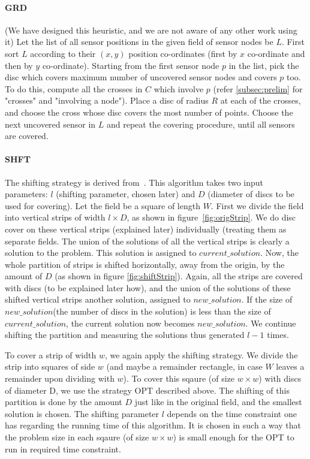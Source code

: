 \paragraph*{GRD} 
(We have designed this heuristic, and we are not aware of any other work using it) Let the list of all sensor positions in the given field of sensor nodes be $L$. First sort $L$ according to their $(x,y)$ position co-ordinates (first by $x$ co-ordinate and then by $y$ co-ordinate). Starting from the first sensor node $p$ in the list, pick the disc which covers maximum number of uncovered sensor nodes and covers $p$ too. To do this, compute all the crosses in $C$ which involve $p$ (refer \ref{subsec:prelim} for "crosses" and "involving a node"). Place a disc of radius $R$ at each of the crosses, and choose the cross whose disc covers the most number of points. Choose the next uncovered sensor in $L$ and repeat the covering procedure, until all sensors are covered.

\paragraph*{SHFT} 
The shifting strategy is derived from~\cite{shifting}. This algorithm takes two input parameters: $l$ (shifting parameter, chosen later) and $D$ (diameter of discs to be used for covering). Let the field be a square of length $W$. First we divide the field into vertical strips of width $l \times D$, as shown in figure~\ref{fig:origStrip}. We do disc cover on these vertical strips (explained later) individually (treating them as separate fields. The union of the solutions of all the vertical strips is clearly a solution to the problem. This solution is assigned to $current\_solution$. Now, the whole partition of strips is shifted horizontally, away from the origin, by the amount of $D$ (as shown in figure \ref{fig:shiftStrip}). Again, all the strips are covered with discs (to be explained later how), and the union of the solutions of these shifted vertical strips another solution, assigned to $new\_solution$. If the size of $new\_solution$(the number of discs in the solution) is less than the size of $current\_solution$, the current solution now becomes $new\_solution$. We continue shifting the partition and measuring the solutions thus generated $l-1$ times.

To cover a strip of width $w$, we again apply the shifting strategy. We divide the strip into squares of side $w$ (and maybe a remainder rectangle, in case $W$ leaves a remainder upon dividing with $w$). To cover this sqaure (of size $w \times w$) with discs of diameter D, we use the strategy OPT described above. The shifting of this partition is done by the amount $D$ just like in the original field, and the smallest solution is chosen. The shifting parameter $l$ depends on the time constraint one has regarding the running time of this algorithm. It is chosen in such a way that the problem size in each sqaure (of size $w \times w$) is small enough for the OPT to run in required time constraint.

